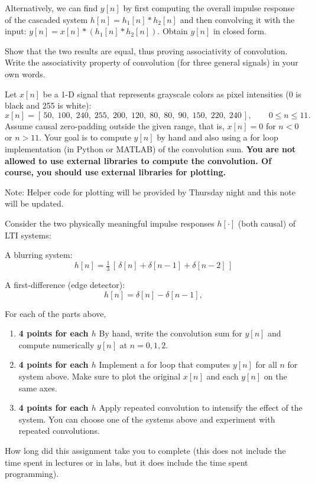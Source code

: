 \documentclass{ee102_pset}
\begin{document}
\problempart [15 points] Alternatively, we can find $y[n]$ by first computing the overall impulse response of the cascaded system $h[n] = h_1[n] * h_2[n]$ and then convolving it with the input: $y[n] = x[n] * (h_1[n] * h_2[n])$. Obtain $y[n]$ in closed form.

\problempart [5 points] Show that the two results are equal, thus proving associativity of convolution. Write the associativity property of convolution (for three general signals) in your own words.


Let $x[n]$ be a 1-D signal that represents grayscale colors as pixel intensities (0 is black and 255 is white):
\[
x[n] = [\,50,\;100,\;240,\;255,\;200,\;120,\;80,\;80,\;90,\;150,\;220,\;240\,],
\qquad 0\le n\le 11.
\]
Assume causal zero-padding outside the given range, that is, $x[n]=0$ for $n<0$ or $n>11$. Your goal is to compute $y[n]$ by hand and also using a for loop implementation (in Python or MATLAB) of the convolution sum. \textbf{You are not allowed to use external libraries to compute the convolution. Of course, you should use external libraries for plotting.}

{\color{red} Note: Helper code for plotting will be provided by Thursday night and this note will be updated.}

Consider the two physically meaningful impulse responses $h[\cdot]$ (both causal) of LTI systems:

\problempart A blurring system:
\[
h[n]=\tfrac13\,[\,\delta[n]+\delta[n-1]+\delta[n-2]\,]
\]

\problempart A first-difference (edge detector):
\[
h[n]=\delta[n]-\delta[n-1],
\]

For each of the parts above, 
\begin{enumerate}
  \item \textbf{4 points for each $h$} By hand, write the convolution sum for $y[n]$ and compute numerically $y[n]$ at $n=0,1,2$.
  \item \textbf{4 points for each $h$} Implement a for loop that computes $y[n]$ for all $n$ for system above. Make sure to plot the original $x[n]$ and each $y[n]$ on the same axes.
  \item \textbf{4 points for each $h$} Apply repeated convolution to intensify the effect of the system. You can choose one of the systems above and experiment with repeated convolutions.
\end{enumerate}

\problempart [1 point] How long did this assignment take you to complete (this does not include the time spent in lectures or in labs, but it does include the time spent programming).
\end{document}
